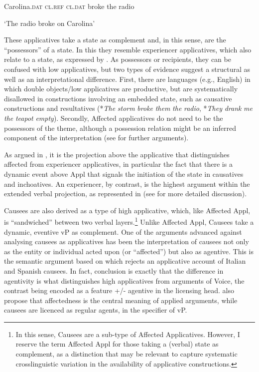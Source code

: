 \documentclass[output=paper,modfonts,nonflat]{langsci/langscibook}
\begin{document}
    Carolina.\textsc{dat} \textsc{cl.ref} \textsc{cl.dat}    broke   the radio 

  ‘The radio broke on Carolina’

These applicatives take a state as complement and, in this sense, are the “possessors” of a state. In this they resemble experiencer applicatives, which also relate to a state, as expressed by .  As possessors or recipients, they can be confused with low applicatives, but two types of evidence suggest a structural as well as an interpretational difference. First, there are languages (e.g., English) in which double objects/low applicatives are productive, but are systematically disallowed in constructions involving an embedded state, such as causative constructions and resultatives (*\textit{The} \textit{storm} \textit{broke} \textit{them} \textit{the} \textit{radio}, *\textit{They} \textit{drank} \textit{me} \textit{the} \textit{teapot} \textit{empty}). Secondly, Affected applicatives do not need to be the possessors of the theme, although a possession relation might be an inferred component of the interpretation (see \citealt{Cuervo2003} for further arguments). 

As argued in , it is the projection above the applicative that distinguishes affected from experiencer applicatives, in particular the fact that there is a dynamic event above Appl that signals the initiation of the state in causatives and inchoatives. An experiencer, by contrast, is the highest argument within the extended verbal projection, as represented in  (see  for more detailed discussion).  

Causees are also derived as a type of high applicative, which, like Affected Appl, is “sandwiched” between two verbal layers.\footnote{In this sense, Causees are a sub-type of Affected Applicatives. However, I reserve the term Affected Appl for those taking a (verbal) state as complement, as a distinction that may be relevant to capture systematic crosslinguistic variation in the availability of applicative constructions.}  Unlike Affected Appl, Causees take a dynamic, eventive vP as complement. One of the arguments advanced against analysing causees as applicatives has been the interpretation of causees not only as the entity or individual acted upon (or “affected”) but also as agentive. This is the semantic argument based on which \citet{Tubino2012} rejects an applicative account of Italian and Spanish causees. In fact,  conclusion is exactly that the difference in agentivity is what distinguishes high applicatives from arguments of Voice, the contrast being encoded as a feature +/- agentive in the licensing head. \citet{BonehNash2011} also propose that affectedness is the central meaning of applied arguments, while causees are licenced as regular agents, in the specifier of vP. 
\end{document}
